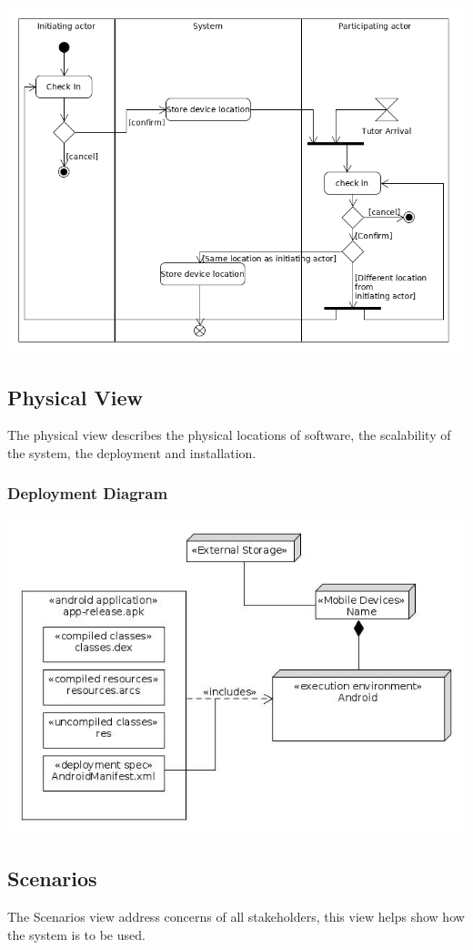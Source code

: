 \documentclass[12pt]{article}
\begin{document}
\includegraphics[width=140mm]{./activity_diagram/checked_in.png}
\subsection{Physical View}
The physical view describes the physical locations of software, the scalability of the system, the deployment and installation.
\subsubsection{Deployment Diagram}

\includegraphics[width=140mm]{./Deployment.jpg}

\subsection{Scenarios}
The Scenarios view address concerns of all stakeholders, this view helps show how the system is to be used.
\end{document}
